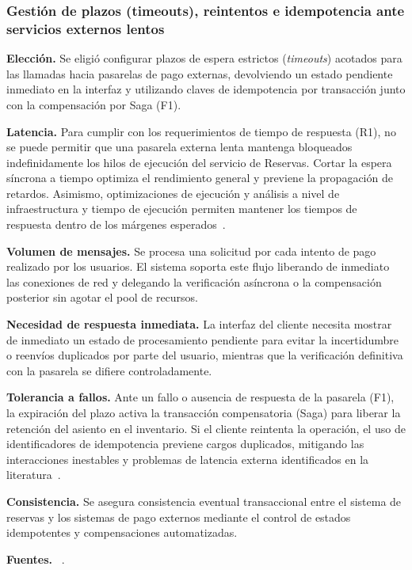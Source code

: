 \documentclass[11pt,a4paper]{article}
\newcommand{\decision}[8]{\subsubsection*{#1}%
  \textbf{Elección.} #2\par
  \textbf{Latencia.} #3\par
  \textbf{Volumen de mensajes.} #4\par
  \textbf{Necesidad de respuesta inmediata.} #5\par
  \textbf{Tolerancia a fallos.} #6\par
  \textbf{Consistencia.} #7\par
  \textbf{Fuentes.} #8\par}
\begin{document}
\decision{Gestión de plazos (timeouts), reintentos e idempotencia ante servicios externos lentos}
 {Se eligió configurar plazos de espera estrictos (\textit{timeouts}) acotados para las llamadas hacia pasarelas de pago externas, devolviendo un estado pendiente inmediato en la interfaz y utilizando claves de idempotencia por transacción junto con la compensación por Saga (F1).}
 {Para cumplir con los requerimientos de tiempo de respuesta (R1), no se puede permitir que una pasarela externa lenta mantenga bloqueados indefinidamente los hilos de ejecución del servicio de Reservas. Cortar la espera síncrona a tiempo optimiza el rendimiento general y previene la propagación de retardos. Asimismo, optimizaciones de ejecución y análisis a nivel de infraestructura y tiempo de ejecución permiten mantener los tiempos de respuesta dentro de los márgenes esperados~\cite{10.1145/3486606.3488075}.}
 {Se procesa una solicitud por cada intento de pago realizado por los usuarios. El sistema soporta este flujo liberando de inmediato las conexiones de red y delegando la verificación asíncrona o la compensación posterior sin agotar el pool de recursos.}
 {La interfaz del cliente necesita mostrar de inmediato un estado de procesamiento pendiente para evitar la incertidumbre o reenvíos duplicados por parte del usuario, mientras que la verificación definitiva con la pasarela se difiere controladamente.}
 {Ante un fallo o ausencia de respuesta de la pasarela (F1), la expiración del plazo activa la transacción compensatoria (Saga) para liberar la retención del asiento en el inventario. Si el cliente reintenta la operación, el uso de identificadores de idempotencia previene cargos duplicados, mitigando las interacciones inestables y problemas de latencia externa identificados en la literatura~\cite{CERNY2023111829}.}
 {Se asegura consistencia eventual transaccional entre el sistema de reservas y los sistemas de pago externos mediante el control de estados idempotentes y compensaciones automatizadas.}
 {~\cite{CERNY2023111829, 10.1145/3486606.3488075}.}
\end{document}

